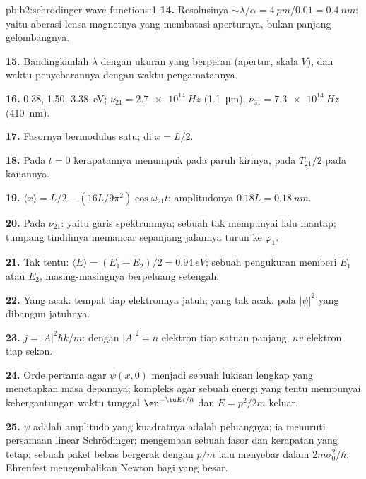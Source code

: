 \begin{solution}{pb:b2:schrodinger-wave-functions:1}
\textbf{14.} Resolusinya $\sim\lambda/\alpha = \qty{4}{pm}/0.01 = \qty{0.4}{nm}$: yaitu
aberasi lensa magnetnya yang membatasi aperturnya, bukan panjang gelombangnya.

\textbf{15.} Bandingkanlah $\lambda$ dengan ukuran yang berperan (apertur, skala
$V$), dan waktu penyebarannya dengan waktu pengamatannya.

\textbf{16.} \qty{0.38}{}, \qty{1.50}{}, \qty{3.38}{eV}; $\nu_{21} = \qty{2.7e14}{Hz}$
(\qty{1.1}{\micro m}), $\nu_{31} = \qty{7.3e14}{Hz}$ (\qty{410}{nm}).

\textbf{17.} Fasornya bermodulus satu; di $x = L/2$.

\textbf{18.} Pada $t = 0$ kerapatannya menumpuk pada paruh kirinya, pada
$T_{21}/2$ pada kanannya.

\textbf{19.} $\langle x\rangle = L/2 - (16L/9\pi^2)\cos\omega_{21}t$: amplitudonya
$0.18L = \qty{0.18}{nm}$.

\textbf{20.} Pada $\nu_{21}$: yaitu garis spektrumnya; sebuah  tak mempunyai
 lalu mantap; tumpang tindihnya memancar sepanjang jalannya
turun ke $\varphi_1$.

\textbf{21.} Tak tentu: $\langle E\rangle = (E_1 + E_2)/2 = \qty{0.94}{eV}$; sebuah
pengukuran memberi $E_1$ atau $E_2$, masing-masingnya berpeluang setengah.

\textbf{22.} Yang acak: tempat tiap elektronnya jatuh; yang tak acak:
pola $|\psi|^2$ yang dibangun jatuhnya.

\textbf{23.} $j = |A|^2\hbar k/m$: dengan $|A|^2 = n$ elektron tiap satuan panjang,
$nv$ elektron tiap sekon.

\textbf{24.} Orde pertama agar $\psi(x,0)$ menjadi sebuah lukisan lengkap
yang menetapkan masa depannya; kompleks agar sebuah energi yang tentu mempunyai
kebergantungan waktu tunggal $\eu^{-\iu Et/\hbar}$ dan $E = p^2/2m$ keluar.

\textbf{25.} $\psi$ adalah amplitudo yang kuadratnya adalah peluangnya; ia
menuruti persamaan linear Schrödinger;  mengemban sebuah
fasor dan kerapatan yang tetap; sebuah paket bebas bergerak dengan $p/m$ lalu menyebar
dalam $2m\sigma_0^2/\hbar$; Ehrenfest mengembalikan Newton bagi yang besar.
\end{solution}
